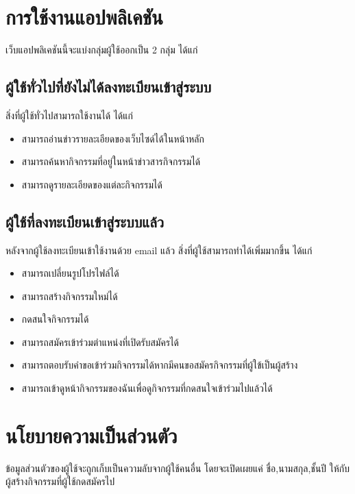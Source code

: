 \section{การใช้งานแอปพลิเคชัน}
เว็บแอปพลิเคชันนี้จะแบ่งกลุ่มผู้ใช้ออกเป็น 2 กลุ่ม ได้แก่
\subsection{ผู้ใช้ทั่วไปที่ยังไม่ได้ลงทะเบียนเข้าสู่ระบบ}
สิ่งที่ผู้ใช้ทั่วไปสามารถใช้งานได้ ได้แก่
\begin{itemize}
    \item สามารถอ่านข่าวรายละเอียดของเว็บไซด์ได้ในหน้าหลัก
    \item สามารถค้นหากิจกรรมที่อยู่ในหน้าข่าวสารกิจกรรมได้
    \item สามารถดูรายละเอียดของแต่ละกิจกรรมได้
\end{itemize}

\newpage

\subsection{ผู้ใช้ที่ลงทะเบียนเข้าสู่ระบบแล้ว}
หลังจากผู้ใช้ลงทะเบียนเข้าใช้งานด้วย email แล้ว สิ่งที่ผู้ใช้สามารถทำได้เพิ่มมากขึ้น ได้แก่
\begin{itemize}
    \item สามารถเปลี่ยนรูปโปรไฟล์ได้
    \item สามารถสร้างกิจกรรมใหม่ได้
    \item กดสนใจกิจกรรมได้
    \item สามารถสมัครเข้าร่วมตำแหน่งที่เปิดรับสมัครได้
    \item สามารถตอบรับคำขอเข้าร่วมกิจกรรมได้หากมีคนขอสมัครกิจกรรมที่ผู้ใข้เป็นผู้สร้าง
    \item สามารถเข้าดูหน้ากิจกรรมของฉันเพื่อดูกิจกรรมที่กดสนใจเข้าร่วมไปแล้วได้
\end{itemize}
\section{นโยบายความเป็นส่วนตัว}
ข้อมูลส่วนตัวของผู้ใช้จะถูกเก็บเป็นความลับจากผู้ใช้คนอื่น โดยจะเปิดเผยแค่ ชื่อ,นามสกุล,ชั้นปี ให้กับผู้สร้างกิจกรรมที่ผู้ใช้กดสมัครไป
